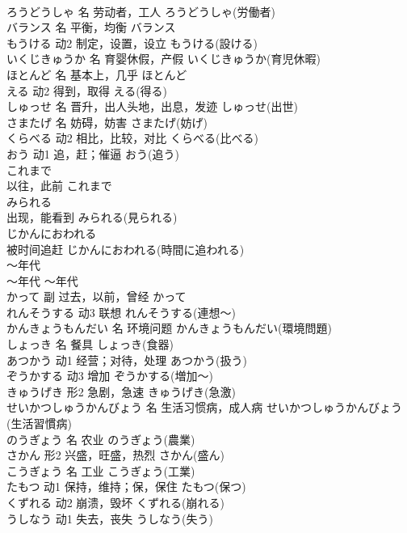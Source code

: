 \documentclass[8pt]{extreport}
\begin{document}
\begin{CJK}{UTF8}{min}
\\	ろうどうしゃ	名	劳动者，工人	ろうどうしゃ(労働者)	
\\	バランス	名	平衡，均衡	バランス	
\\	もうける	动2	制定，设置，设立	もうける(設ける)	
\\	いくじきゅうか	名	育婴休假，产假	いくじきゅうか(育児休暇)	
\\	ほとんど	名	基本上，几乎	ほとんど	
\\	える	动2	得到，取得	える(得る)	
\\	しゅっせ	名	晋升，出人头地，出息，发迹	しゅっせ(出世)	
\\	さまたげ	名	妨碍，妨害	さまたげ(妨げ)	
\\	くらべる	动2	相比，比较，对比	くらべる(比べる)	
\\	おう	动1	追，赶；催逼	おう(追う)	
\\	これまで	
\\	以往，此前	これまで	
\\	みられる	
\\	出现，能看到	みられる(見られる)	
\\	じかんにおわれる	
\\	被时间追赶	じかんにおわれる(時間に追われる)	
\\	～年代	
\\	～年代	～年代	
\\	かって	副	过去，以前，曾经	かって	
\\	れんそうする	动3	联想	れんそうする(連想～)	
\\	かんきょうもんだい	名	环境问题	かんきょうもんだい(環境問題)	
\\	しょっき	名	餐具	しょっき(食器)	
\\	あつかう	动1	经营；对待，处理	あつかう(扱う)	
\\	ぞうかする	动3	增加	ぞうかする(増加～)	
\\	きゅうげき	形2	急剧，急速	きゅうげき(急激)	
\\	せいかつしゅうかんびょう	名	生活习惯病，成人病	せいかつしゅうかんびょう(生活習慣病)	
\\	のうぎょう	名	农业	のうぎょう(農業)	
\\	さかん	形2	兴盛，旺盛，热烈	さかん(盛ん)	
\\	こうぎょう	名	工业	こうぎょう(工業)	
\\	たもつ	动1	保持，维持；保，保住	たもつ(保つ)	
\\	くずれる	动2	崩溃，毁坏	くずれる(崩れる)	
\\	うしなう	动1	失去，丧失	うしなう(失う)	

\end{CJK}
\end{document}
